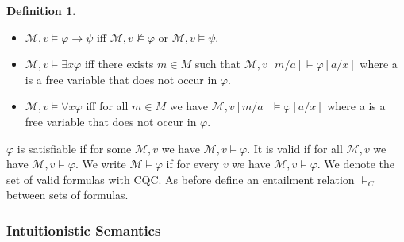 \documentclass[a4paper,12pt]{report}
\theoremstyle{definition}
\theoremstyle{definition}
\theoremstyle{definition}
\theoremstyle{definition}
\theoremstyle{definition}
\newtheorem{definition}[theorem]{Definition}
\theoremstyle{definition}
\theoremstyle{definition}
\begin{document}
\begin{definition}
\begin{itemize}
			\item $\mathcal M, v\models \varphi\to\psi$ iff $\mathcal M, v\not\models\varphi$ or $\mathcal M, v\models\psi$.
			\item $\mathcal M, v\models\exists x\varphi$ iff there exists $m\in M$ such that $\mathcal M, v[m/a]\models\varphi[a/x]$ where a is a free variable that does not occur in $\varphi$.
			\item $\mathcal M, v\models\forall x\varphi$ iff for all $m\in M$ we have $\mathcal M, v[m/a]\models\varphi[a/x]$ where a is a free variable that does not occur in $\varphi$.
		\end{itemize}
		$\varphi$ is satisfiable if for some $\mathcal{M}, v$ we have  $\mathcal M, v\models\varphi$. It is valid if for all  $\mathcal M, v$ we have  $\mathcal M, v\models\varphi$. We write $\mathcal{M}\models\varphi$ if for every $v$ we have  $\mathcal M, v\models\varphi$. We denote the set of valid formulas with CQC. As before define an entailment relation $\models_C$ between sets of formulas.
	\end{definition}

	\subsubsection{Intuitionistic Semantics}
	
\end{document}
